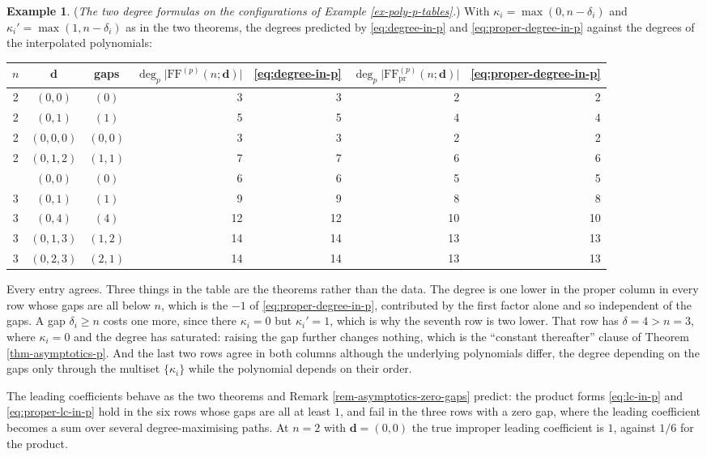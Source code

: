 \documentclass[11pt, a4paper, abstract=yes]{scrartcl}
\theoremstyle{definition}
\newtheorem{mexample}[definition]{Example}
\theoremstyle{remark}
\theoremstyle{plain}
\newcommand{\vek}[1]{\boldsymbol{#1}}
\begin{document}
\begin{mexample}
(\emph{The two degree formulas on the configurations of Example \ref{ex-poly-p-tables}.}) With
\(\kappa_i=\max(0,n-\delta_i)\) and \(\kappa_i'=\max(1,n-\delta_i)\) as in the two theorems, the
degrees predicted by \eqref{eq:degree-in-p} and \eqref{eq:proper-degree-in-p} against the degrees of
the interpolated polynomials:
\begingroup\small
\begin{center}
\begin{tabular}{@{}cccrrrr@{}}
  \toprule
  \(n\) & \(\vek d\) & gaps & \(\deg_p\lvert\mathrm{FF}^{(p)}(n;\vek d)\rvert\) & \eqref{eq:degree-in-p}
        & \(\deg_p\lvert\mathrm{FF}^{(p)}_{\mathrm{pr}}(n;\vek d)\rvert\) & \eqref{eq:proper-degree-in-p}\\
  \midrule
  2 & \((0,0)\)   & \((0)\)   & 3  & 3  & 2  & 2\\
  2 & \((0,1)\)   & \((1)\)   & 5  & 5  & 4  & 4\\
  2 & \((0,0,0)\) & \((0,0)\) & 3  & 3  & 2  & 2\\
  2 & \((0,1,2)\) & \((1,1)\) & 7  & 7  & 6  & 6\\
  \addlinespace
  3 & \((0,0)\)   & \((0)\)   & 6  & 6  & 5  & 5\\
  3 & \((0,1)\)   & \((1)\)   & 9  & 9  & 8  & 8\\
  3 & \((0,4)\)   & \((4)\)   & 12 & 12 & 10 & 10\\
  3 & \((0,1,3)\) & \((1,2)\) & 14 & 14 & 13 & 13\\
  3 & \((0,2,3)\) & \((2,1)\) & 14 & 14 & 13 & 13\\
  \bottomrule
\end{tabular}
\label{tab-degree-check}
\end{center}
\endgroup
Every entry agrees. Three things in the table are the theorems rather than the data. The degree is
one lower in the proper column in every row whose gaps are all below \(n\), which is the \(-1\) of
\eqref{eq:proper-degree-in-p}, contributed by the first factor alone and so independent of the
gaps. A gap \(\delta_i\ge n\) costs one more, since there \(\kappa_i=0\) but \(\kappa_i'=1\), which is
why the seventh row is two lower. That row has
\(\delta=4>n=3\), where \(\kappa_i=0\) and the degree has saturated: raising the gap further changes
nothing, which is the ``constant thereafter'' clause of Theorem \ref{thm-asymptotics-p}. And the last two
rows agree in both columns although the underlying polynomials differ, the degree depending on the
gaps only through the multiset \(\lbrace\kappa_i\rbrace\) while the polynomial depends on their order.

The leading coefficients behave as the two theorems and Remark \ref{rem-asymptotics-zero-gaps} predict:
the product forms \eqref{eq:lc-in-p} and \eqref{eq:proper-lc-in-p} hold in the six rows whose gaps
are all at least \(1\), and fail in the three rows with a zero gap, where the leading coefficient
becomes a sum over several degree-maximising paths. At \(n=2\) with \(\vek d=(0,0)\) the true improper
leading coefficient is \(1\), against \(1/6\) for the product.
\label{ex-degrees-p}
\end{mexample}
\end{document}
